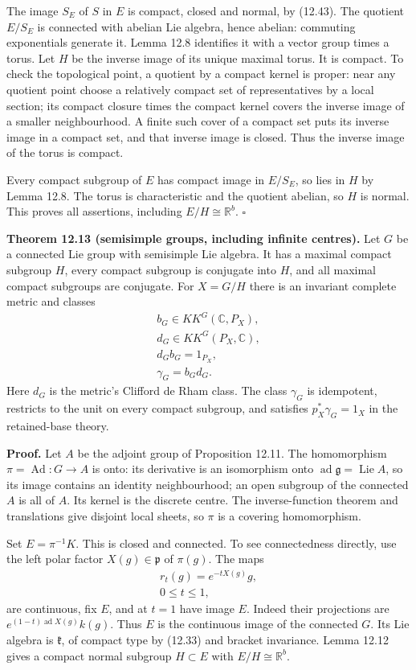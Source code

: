 \documentclass[
  11pt,
]{article}
\begin{document}
The image \(S_E\) of \(S\) in \(E\) is compact, closed and normal, by
(12.43). The quotient \(E/S_E\) is connected with abelian Lie algebra,
hence abelian: commuting exponentials generate it. Lemma 12.8 identifies
it with a vector group times a torus. Let \(H\) be the inverse image of
its unique maximal torus. It is compact. To check the topological point,
a quotient by a compact kernel is proper: near any quotient point choose
a relatively compact set of representatives by a local section; its
compact closure times the compact kernel covers the inverse image of a
smaller neighbourhood. A finite such cover of a compact set puts its
inverse image in a compact set, and that inverse image is closed. Thus
the inverse image of the torus is compact.

Every compact subgroup of \(E\) has compact image in \(E/S_E\), so lies
in \(H\) by Lemma 12.8. The torus is characteristic and the quotient
abelian, so \(H\) is normal. This proves all assertions, including
\(E/H\cong\mathbb R^b\). \(\square\)

\textbf{Theorem 12.13 (semisimple groups, including infinite centres).}
Let \(G\) be a connected Lie group with semisimple Lie algebra. It has a
maximal compact subgroup \(H\), every compact subgroup is conjugate into
\(H\), and all maximal compact subgroups are conjugate. For \(X=G/H\)
there is an invariant complete metric and classes \[
\begin{gathered}
b_G\in KK^G(\mathbb C,P_X),\\
d_G\in KK^G(P_X,\mathbb C),\\
d_G b_G=1_{P_X},\\
\gamma_G=b_G d_G.
\end{gathered}
\tag{12.45}
\] Here \(d_G\) is the metric's Clifford de Rham class. The class
\(\gamma_G\) is idempotent, restricts to the unit on every compact
subgroup, and satisfies \(p_X^*\gamma_G=1_X\) in the retained-base
theory.

\textbf{Proof.} Let \(A\) be the adjoint group of Proposition 12.11. The
homomorphism \(\pi=\operatorname{Ad}:G\to A\) is onto: its derivative is
an isomorphism onto
\(\operatorname{ad}\mathfrak g=\operatorname{Lie}A\), so its image
contains an identity neighbourhood; an open subgroup of the connected
\(A\) is all of \(A\). Its kernel is the discrete centre. The
inverse-function theorem and translations give disjoint local sheets, so
\(\pi\) is a covering homomorphism.

Set \(E=\pi^{-1}K\). This is closed and connected. To see connectedness
directly, use the left polar factor \(X(g)\in\mathfrak p\) of
\(\pi(g)\). The maps \[
\begin{gathered}
r_t(g)=e^{-tX(g)}g,\\
0\leq t\leq1,
\end{gathered}
\tag{12.46}
\] are continuous, fix \(E\), and at \(t=1\) have image \(E\). Indeed
their projections are \(e^{(1-t)\operatorname{ad}X(g)}k(g)\). Thus \(E\)
is the continuous image of the connected \(G\). Its Lie algebra is
\(\mathfrak k\), of compact type by (12.33) and bracket invariance.
Lemma 12.12 gives a compact normal subgroup \(H\subset E\) with
\(E/H\cong\mathbb R^b\).
\end{document}
